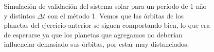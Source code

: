 \begin{figure}
{	\label{fig:ej2_m1_365_12}
	}
	\caption{
		Simulación de validación del sistema solar para un período de 1 año y distintos $\Delta t$
		con el método 1.
		Vemos que las órbitas de los planetas del ejercicio anterior se siguen comportando bien,
		lo que era de esperarse ya que los planetas que agregamos no deberían influenciar demasiado sus órbitas, por estar muy distanciados.
	}
	\label{ fig:res_ej2_m1_365 }
\end{figure}
